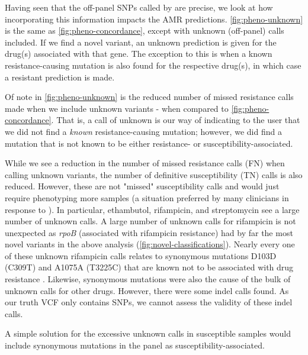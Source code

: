 Having seen that the off-panel SNPs called by \drprg{} are precise, we look at how incorporating this information impacts the AMR predictions. \autoref{fig:pheno-unknown} is the same as \autoref{fig:pheno-concordance}, except with unknown (off-panel) calls included. If we find a novel variant, an unknown prediction is given for the drug(s) associated with that gene. The exception to this is when a known resistance-causing mutation is also found for the respective drug(s), in which case a resistant prediction is made.

Of note in \autoref{fig:pheno-unknown} is the reduced number of missed resistance calls made when we include unknown variants - when compared to \autoref{fig:pheno-concordance}. That is, a call of unknown is our way of indicating to the user that we did not find a \emph{known} resistance-causing mutation; however, we did find a mutation that is not known to be either resistance- or susceptibility-associated.

While we see a reduction in the number of missed resistance calls (FN) when calling unknown variants, the number of definitive susceptibility (TN) calls is also reduced. However, these are not "missed" susceptibility calls and would just require phenotyping more samples (a situation preferred by many clinicians in response to \cite{hunt2019}). In particular, ethambutol, rifampicin, and streptomycin see a large number of unknown calls. A large number of unknown calls for rifampicin is not unexpected as \textit{rpoB} (associated with rifampicin resistance) had by far the most novel variants in the above analysis (\autoref{fig:novel-classifications}). Nearly every one of these unknown rifampicin calls relates to synonymous mutations D103D (C309T) and A1075A (T3225C) that are known not to be associated with drug resistance \cite{Jagielski2018}. Likewise, synonymous mutations were also the cause of the bulk of unknown calls for other drugs. However, there were some indel calls found. As our truth VCF only contains SNPs, we cannot assess the validity of these indel calls.

A simple solution for the excessive unknown calls in susceptible samples would include synonymous mutations in the panel as susceptibility-associated.

